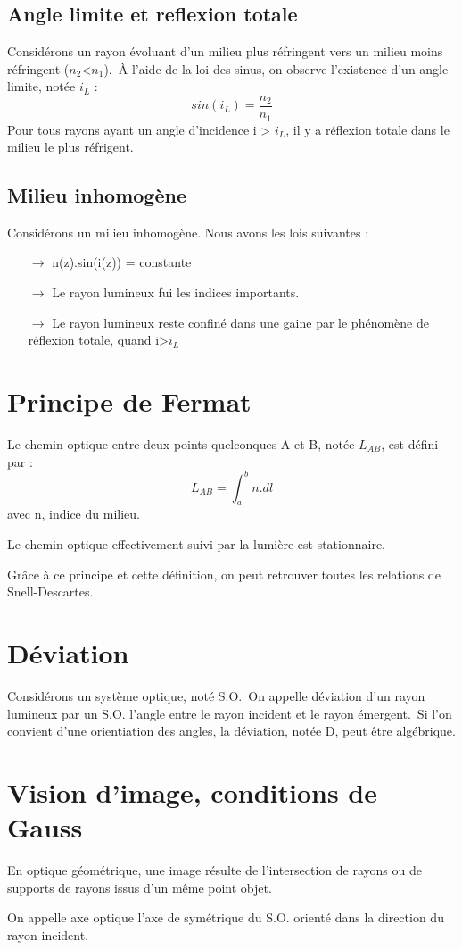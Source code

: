 \subsection{Angle limite et reflexion totale}
Considérons un rayon évoluant d'un milieu plus réfringent vers un milieu moins réfringent ($n_2$<$n_1$).\
À l'aide de la loi des sinus, on observe l'existence d'un angle limite, notée $i_L$ :
$$sin(i_L) = \dfrac{n_2}{n_1}$$
Pour tous rayons ayant un angle d'incidence i > $i_L$, il y a réflexion totale dans le milieu le plus réfrigent.
\subsection{Milieu inhomogène}
Considérons un milieu inhomogène. Nous avons les lois suivantes :
\begin{itemize}
 \item[$\rightarrow$] n(z).sin(i(z)) = constante
 \item[$\rightarrow$] Le rayon lumineux fui les indices importants.
 \item[$\rightarrow$] Le rayon lumineux reste confiné dans une gaine par le phénomène de réflexion totale, quand i>$i_L$ 
\end{itemize}
\section{Principe de Fermat}
\begin{de}
Le chemin optique entre deux points quelconques A et B, notée $L_{AB}$, est défini par :
$$L_{AB} = \int_a^b n.dl$$
avec n, indice du milieu.
\end{de}
\begin{princ}
Le chemin optique effectivement suivi par la lumière est stationnaire.
\end{princ}
Grâce à ce principe et cette définition, on peut retrouver toutes les relations de Snell-Descartes.
\section{Déviation}
\begin{de}
Considérons un système optique, noté S.O.\
On appelle déviation d'un rayon lumineux par un S.O. l'angle entre le rayon incident et le rayon émergent.\
Si l'on convient d'une orientiation des angles, la déviation, notée D, peut être algébrique.
\end{de}
\section{Vision d'image, conditions de Gauss}
\begin{de}
En optique géométrique, une image résulte de l'intersection de rayons ou de supports de rayons issus d'un même point objet.
\end{de}
\begin{de}
On appelle axe optique l'axe de symétrique du S.O. orienté dans la direction du rayon incident.
\end{de}
